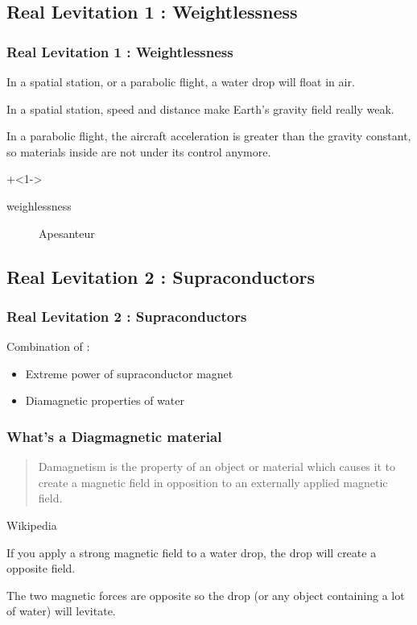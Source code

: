 \documentclass{beamer}
\begin{document}
\subsection{Real Levitation 1 : Weightlessness}
\begin{frame}
\frametitle{Real Levitation 1 : Weightlessness}

In a spatial station, or a parabolic flight, a water drop will float in air.

\pause

In a spatial station, speed and distance make Earth's gravity field really weak.

\pause

In a parabolic flight, the aircraft acceleration is greater than the gravity constant, so materials inside are not under
its control anymore.

\onslide+<1->
\begin{description} 
    \item[weighlessness] Apesanteur
\end{description}
\end{frame}

\subsection{Real Levitation 2 : Supraconductors}
\begin{frame}
\frametitle{Real Levitation 2 : Supraconductors}

Combination of :

\begin{itemize}
    \item Extreme power of supraconductor magnet
    \item Diamagnetic properties of water
\end{itemize}
\end{frame}

\begin{frame}
\frametitle{What's a Diagmagnetic material}

\begin{quotation}
Damagnetism is the property of an object or material which causes it to create a magnetic field in opposition to an
externally applied magnetic field.
\end{quotation}
\begin{flushright}Wikipedia\end{flushright}

\pause

If you apply a strong magnetic field to a water drop, the drop will create a opposite field.
\medskip


The two magnetic forces are opposite so the drop (or any object containing a lot of water) will levitate.
\end{frame}
\end{document}
